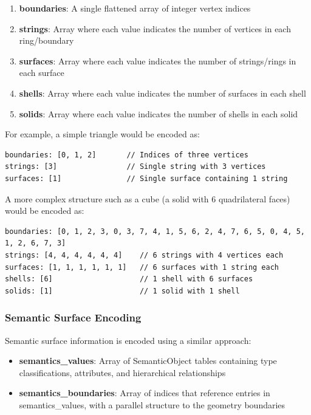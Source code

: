 \begin{enumerate}
  \item \textbf{boundaries}: A single flattened array of integer vertex indices
  \item \textbf{strings}: Array where each value indicates the number of vertices in each ring/boundary
  \item \textbf{surfaces}: Array where each value indicates the number of strings/rings in each surface
  \item \textbf{shells}: Array where each value indicates the number of surfaces in each shell
  \item \textbf{solids}: Array where each value indicates the number of shells in each solid
\end{enumerate}

For example, a simple triangle would be encoded as:

\begin{verbatim}
boundaries: [0, 1, 2]       // Indices of three vertices
strings: [3]                // Single string with 3 vertices
surfaces: [1]               // Single surface containing 1 string
\end{verbatim}

A more complex structure such as a cube (a solid with 6 quadrilateral faces) would be encoded as:

\begin{verbatim}
boundaries: [0, 1, 2, 3, 0, 3, 7, 4, 1, 5, 6, 2, 4, 7, 6, 5, 0, 4, 5, 1, 2, 6, 7, 3]
strings: [4, 4, 4, 4, 4, 4]    // 6 strings with 4 vertices each
surfaces: [1, 1, 1, 1, 1, 1]   // 6 surfaces with 1 string each
shells: [6]                    // 1 shell with 6 surfaces
solids: [1]                    // 1 solid with 1 shell
\end{verbatim}

\subsubsection{Semantic Surface Encoding}
\label{methodology:feature_encoding:geometry_encoding:semantics}

Semantic surface information is encoded using a similar approach:

\begin{itemize}
  \item \textbf{semantics\_values}: Array of SemanticObject tables containing type classifications, attributes, and hierarchical relationships
  \item \textbf{semantics\_boundaries}: Array of indices that reference entries in semantics\_values, with a parallel structure to the geometry boundaries
\end{itemize}

